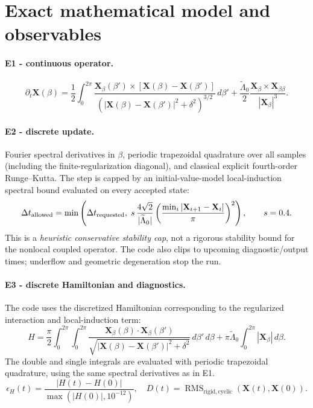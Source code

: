 \documentclass[11pt,a4paper]{article}
\begin{document}

\section{Exact mathematical model and observables}
\paragraph{E1 - continuous operator.}
\begin{equation}
\partial_t\mathbf X(\beta)=\frac12\int_0^{2\pi}\!\frac{\mathbf X_{\beta}(\beta')\times[\mathbf X(\beta)-\mathbf X(\beta')]}{(|\mathbf X(\beta)-\mathbf X(\beta')|^2+\delta^2)^{3/2}}\,d\beta'
+\frac{\widetilde\Lambda_0}{2}\frac{\mathbf X_\beta\times\mathbf X_{\beta\beta}}{|\mathbf X_\beta|^3} .\label{eq:E1}
\end{equation}
\paragraph{E2 - discrete update.} Fourier spectral derivatives in $\beta$, periodic trapezoidal quadrature over all samples (including the finite-regularization diagonal), and classical explicit fourth-order Runge--Kutta. The step is capped by an initial-value-model local-induction spectral bound evaluated on every accepted state:
\begin{equation}
\Delta t_{\rm allowed}=\min\left(\Delta t_{\rm requested},\;s\,\frac{4\sqrt{2}}{|\widetilde\Lambda_0|}\left(\frac{\min_i|\mathbf X_{i+1}-\mathbf X_i|}{\pi}\right)^2\right),\qquad s=0.4.\label{eq:E2}
\end{equation}
This is a \emph{heuristic conservative stability cap}, not a rigorous stability bound for the nonlocal coupled operator. The code also clips to upcoming diagnostic/output times; underflow and geometric degeneration stop the run.
\paragraph{E3 - discrete Hamiltonian and diagnostics.} The code uses the discretized Hamiltonian corresponding to the regularized interaction and local-induction term:
\begin{equation}
H = \frac{\pi}{2}\!\int_0^{2\pi}\!\int_0^{2\pi}\!
\frac{\mathbf X_\beta(\beta)\cdot\mathbf X_\beta(\beta')}
{\sqrt{|\mathbf X(\beta)-\mathbf X(\beta')|^2+\delta^2}}\,d\beta'\,d\beta
+\pi\widetilde\Lambda_0\int_0^{2\pi}|\mathbf X_\beta|\,d\beta.
\end{equation}
The double and single integrals are evaluated with periodic trapezoidal quadrature, using the same spectral derivatives as in E1.
\begin{equation}
\epsilon_H(t)=\frac{|H(t)-H(0)|}{\max(|H(0)|,10^{-12})},\quad
D(t)=\operatorname{RMS}_{\mathrm{rigid,cyclic}}(\mathbf X(t),\mathbf X(0)).\label{eq:E3}
\end{equation}
\end{document}
